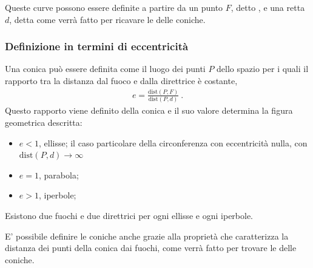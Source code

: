 \documentclass[letterpaper,10pt,english]{jupyterBook}
\begin{document}
\sphinxAtStartPar
Queste curve possono essere definite a partire da un punto \(F\), detto , e una retta \(d\), detta  come verrà fatto per ricavare le {\hyperref[\detokenize{ch/analytic_geometry/analytic_geometry_2d/conics-polar:geometry-analytic-2d-conics-polar}]{}} delle coniche.
\subsubsection*{Definizione in termini di eccentricità}

\sphinxAtStartPar
Una conica può essere definita come il luogo dei punti \(P\) dello spazio per i quali il rapporto tra la distanza dal fuoco e dalla direttrice è costante,
\begin{equation*}
\begin{split}e = \frac{\text{dist}(P,F)}{\text{dist}(P,d)} \ .\end{split}
\end{equation*}
\sphinxAtStartPar
Questo rapporto viene definito  della conica e il suo valore determina la figura geometrica descritta:
\begin{itemize}
\item {} 
\sphinxAtStartPar
\(e<1\), ellisse;
il caso particolare della circonferenza con eccentricità nulla, con \(\text{dist}(P,d) \rightarrow \infty\)

\item {} 
\sphinxAtStartPar
\(e=1\), parabola;

\item {} 
\sphinxAtStartPar
\(e>1\), iperbole;

\end{itemize}

\sphinxAtStartPar
Esistono due fuochi e due direttrici per ogni ellisse e ogni iperbole.

\sphinxAtStartPar
E’ possibile definire le coniche anche grazie alla proprietà che caratterizza la distanza dei punti della conica dai fuochi, come verrà fatto per trovare le {\hyperref[\detokenize{ch/analytic_geometry/analytic_geometry_2d/conics-cartesian:geometry-analytic-2d-conics-cartesian}]{}} delle coniche.
\end{document}
